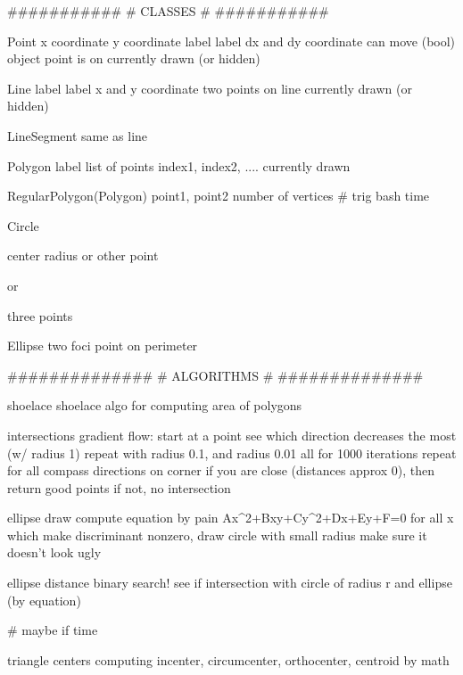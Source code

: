 ###########
# CLASSES #
###########

Point {
    x coordinate
    y coordinate
    label
    label dx and dy coordinate
    can move (bool)
    object point is on
    currently drawn (or hidden)
}

Line {
    label
    label x and y coordinate
    two points on line
    currently drawn (or hidden)
}

LineSegment {
    same as line
}

Polygon {
    label
    list of points
    index1, index2, ....
    currently drawn
}

RegularPolygon(Polygon) {
    point1, point2
    number of vertices
    # trig bash time
}

Circle {
    center
    radius or other point

    or

    three points
}

Ellipse {
    two foci
    point on perimeter
}

##############
# ALGORITHMS #
##############

shoelace {
    shoelace algo for computing area of polygons
}

intersections {
    gradient flow: 
    start at a point
    see which direction decreases the most (w/ radius 1)
    repeat with radius 0.1, and radius 0.01
    all for 1000 iterations
    repeat for all compass directions on corner
    if you are close (distances approx 0), then return good points
    if not, no intersection
}

ellipse draw {
    compute equation by pain
    Ax^2+Bxy+Cy^2+Dx+Ey+F=0
    for all x which make discriminant nonzero, draw circle with small radius
    make sure it doesn't look ugly
}

ellipse distance {
    binary search!
    see if intersection with circle of radius r and ellipse (by equation)
}

# maybe if time

triangle centers {
    computing incenter, circumcenter, orthocenter, centroid by math
}